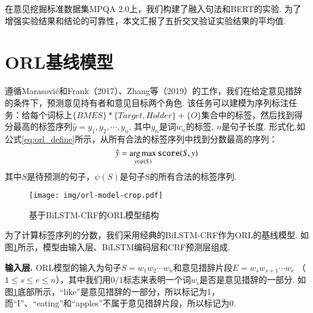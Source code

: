 在意见挖掘标准数据集MPQA 2.0上，我们构建了融入句法和BERT的实验. 为了增强实验结果和结论的可靠性，本文汇报了五折交叉验证实验结果的平均值.
%


\section{ORL基线模型}
遵循Marasovi{\'c}和Frank（2017）、Zhang等（2019）的工作，我们在给定意见措辞的条件下，预测意见持有者和意见目标两个角色. 该任务可以建模为序列标注任务：给每个词标上$\{BMES\}*\{Target, Holder\} + \{O\}$集合中的标签，然后找到得分最高的标签序列$\hat{y} = y_1,y_2,\cdots, y_n$.
其中$y_n$是词$w_n$的标签, $n$是句子长度. 形式化,如公式\ref{eq:orl_define}所示，从所有合法的标签序列中找到分数最高的序列：
\begin{equation}
    \setlength{\abovedisplayskip}{9pt}
    \setlength{\belowdisplayskip}{9pt}
    \label{eq:orl_define}
    \hat{y} = \mathop{\arg\max}_{y \in \psi(S)} \texttt{score}(S, y)
\end{equation}
其中$S$是待预测的句子，$\psi(S)$是句子S的所有合法的标签序列.

\begin{figure}[hb]
    \centering
    \texttt{[image: img/orl-model-crop.pdf]}
    \caption{基于BiLSTM-CRF的ORL模型结构}
    \label{fig:orl_model}
\end{figure}

为了计算标签序列的分数，我们采用经典的BiLSTM-CRF作为ORL的基线模型.
如图\ref{fig:orl_model}所示，模型由输入层、BiLSTM编码层和CRF预测层组成.

\textbf{输入层.  } ORL模型的输入为句子$S=w_1w_2\cdots w_n$和意见措辞片段$E=w_sw_{s+1}\cdots w_e$ （$1 \leq s\leq e \leq n$），其中我们用$0/1$标志来表明一个词$w_i$是否是意见措辞的一部分. 如图\ref{fig:orl_model}底部所示，“like”是意见措辞的一部分，所以标记为1，而“I”、“eating”和“apples”不属于意见措辞片段，所以标记为0.

